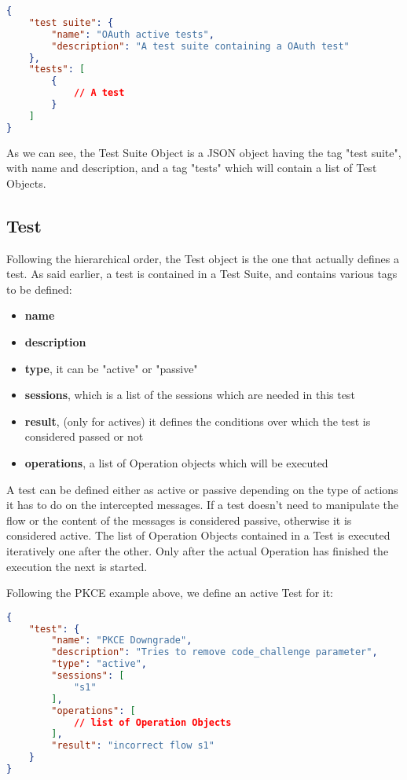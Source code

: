 \begin{lstlisting}[language=json, caption=Test Suite definition]
{
    "test suite": {
        "name": "OAuth active tests",
        "description": "A test suite containing a OAuth test"
    },
    "tests": [
        {
            // A test
        }
    ]
}
\end{lstlisting}

As we can see, the Test Suite Object is a JSON object having the tag "test suite", with name and description, and a tag "tests" which will contain a list of Test Objects.

\subsection{Test}
Following the hierarchical order, the Test object is the one that actually defines a test. As said earlier, a test is contained in a Test Suite, and contains various tags to be defined:
\begin{itemize}
    \item \textbf{name}
    \item \textbf{description}
    \item \textbf{type}, it can be "active" or "passive"
    \item \textbf{sessions}, which is a list of the sessions which are needed in this test
    \item \textbf{result}, (only for actives) it defines the conditions over which the test is considered passed or not
    \item \textbf{operations}, a list of Operation objects which will be executed
\end{itemize}

A test can be defined either as active or passive depending on the type of actions it has to do on the intercepted messages. If a test doesn't need to manipulate the flow or the content of the messages is considered passive, otherwise it is considered active.
The list of Operation Objects contained in a Test is executed iteratively one after the other. Only after the actual Operation has finished the execution the next is started.

Following the PKCE example above, we define an active Test for it:

\begin{lstlisting}[language=json, caption=Active test definition]
{
    "test": {
        "name": "PKCE Downgrade",
        "description": "Tries to remove code_challenge parameter",
        "type": "active",
        "sessions": [
            "s1"
        ],
        "operations": [
            // list of Operation Objects
        ],
        "result": "incorrect flow s1"
    }
}    
\end{lstlisting}

